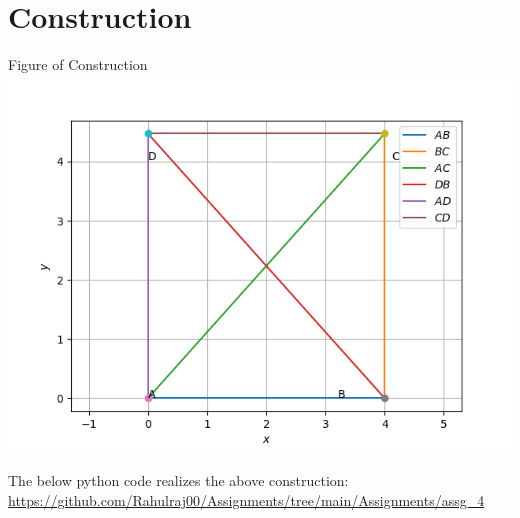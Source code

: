 \documentclass[10pt, a4paper]{article}
\begin{document}
 \section{Construction}
 	\begin{center}
     Figure of Construction
     \includegraphics[scale=0.5]{fig.png}
  	\end{center}
  	\vspace{1mm}
The below python code realizes the above construction:	\\
\url{https://github.com/Rahulraj00/Assignments/tree/main/Assignments/assg_4}

\end{document}

